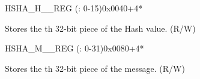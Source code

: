 \begin{register}{H}{SHA\_H\_\_REG (: 0-15)}{0x{}0040+4*}\label{regdesc:SHAHNREG}
%
\regnewline%
\begin{regdesc}\begin{reglist}
\label{fielddesc:SHAH0}\item [SHA\_H\_\regindex{n}] Stores the th 32-bit piece of the Hash value. (R/W)
\end{reglist}\end{regdesc}
\end{register}

\begin{register}{H}{SHA\_M\_\_REG (: 0-31)}{0x{}0080+4*}\label{regdesc:SHAMNREG}
%
\regnewline%
\begin{regdesc}\begin{reglist}
\label{fielddesc:SHAM0}\item [SHA\_M\_\regindex{n}] Stores the th 32-bit piece of the message. (R/W)
\end{reglist}\end{regdesc}
\end{register}